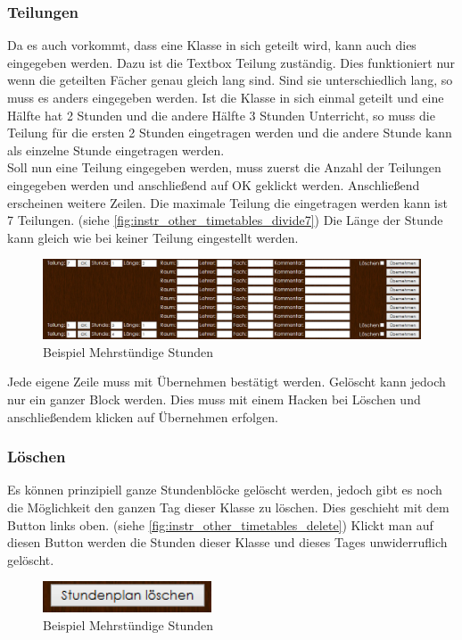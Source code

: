\subsubsection{Teilungen}
Da es auch vorkommt, dass eine Klasse in sich geteilt wird, kann auch dies eingegeben werden. Dazu ist die Textbox Teilung zuständig. Dies funktioniert nur wenn die geteilten Fächer genau gleich lang sind. Sind sie unterschiedlich lang, so muss es anders eingegeben werden. Ist die Klasse in sich einmal geteilt und eine Hälfte hat 2 Stunden und die andere Hälfte 3 Stunden Unterricht, so muss die Teilung für die ersten 2 Stunden eingetragen werden und die andere Stunde kann als einzelne Stunde eingetragen werden.\\
Soll nun eine Teilung eingegeben werden, muss zuerst die Anzahl der Teilungen eingegeben werden und anschließend auf OK geklickt werden. Anschließend erscheinen weitere Zeilen. Die maximale Teilung die eingetragen werden kann ist 7 Teilungen. (siehe \autoref{fig:instr_other_timetables_divide7}) Die Länge der Stunde kann gleich wie bei keiner Teilung eingestellt werden.
\begin{figure}[H]
\centering
\includegraphics[keepaspectratio=true, width=17cm]{images/screenshots/timetables_input_divide7.png}
\caption{Beispiel Mehrstündige Stunden}
\label{fig:instr_other_timetables_divide7}
\end{figure}
Jede eigene Zeile muss mit Übernehmen bestätigt werden. Gelöscht kann jedoch nur ein ganzer Block werden. Dies muss mit einem Hacken bei Löschen und anschließendem klicken auf Übernehmen erfolgen.
\subsubsection{Löschen}
Es können prinzipiell ganze Stundenblöcke gelöscht werden, jedoch gibt es noch die Möglichkeit den ganzen Tag dieser Klasse zu löschen. Dies geschieht mit dem Button links oben. (siehe \autoref{fig:instr_other_timetables_delete}) Klickt man auf diesen Button werden die Stunden dieser Klasse und dieses Tages unwiderruflich gelöscht.
\begin{figure}[H]
\centering
\includegraphics[keepaspectratio=true, width=5cm]{images/screenshots/timetables_input_delete.png}
\caption{Beispiel Mehrstündige Stunden}
\label{fig:instr_other_timetables_delete}
\end{figure}
